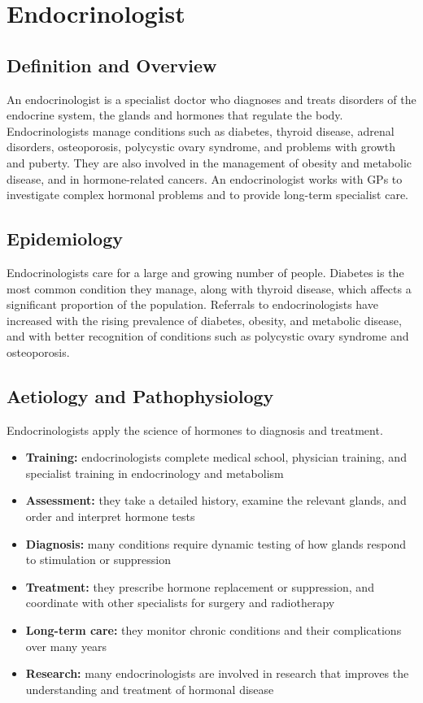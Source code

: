 \chapter{Endocrinologist}

\section*{Definition and Overview}
An endocrinologist is a specialist doctor who diagnoses and treats disorders of the endocrine system, the glands and hormones that regulate the body. Endocrinologists manage conditions such as diabetes, thyroid disease, adrenal disorders, osteoporosis, polycystic ovary syndrome, and problems with growth and puberty. They are also involved in the management of obesity and metabolic disease, and in hormone-related cancers. An endocrinologist works with GPs to investigate complex hormonal problems and to provide long-term specialist care.

\section*{Epidemiology}
Endocrinologists care for a large and growing number of people. Diabetes is the most common condition they manage, along with thyroid disease, which affects a significant proportion of the population. Referrals to endocrinologists have increased with the rising prevalence of diabetes, obesity, and metabolic disease, and with better recognition of conditions such as polycystic ovary syndrome and osteoporosis.

\section*{Aetiology and Pathophysiology}
Endocrinologists apply the science of hormones to diagnosis and treatment.
\begin{itemize}
    \item \textbf{Training:} endocrinologists complete medical school, physician training, and specialist training in endocrinology and metabolism
    \item \textbf{Assessment:} they take a detailed history, examine the relevant glands, and order and interpret hormone tests
    \item \textbf{Diagnosis:} many conditions require dynamic testing of how glands respond to stimulation or suppression
    \item \textbf{Treatment:} they prescribe hormone replacement or suppression, and coordinate with other specialists for surgery and radiotherapy
    \item \textbf{Long-term care:} they monitor chronic conditions and their complications over many years
    \item \textbf{Research:} many endocrinologists are involved in research that improves the understanding and treatment of hormonal disease
\end{itemize}

